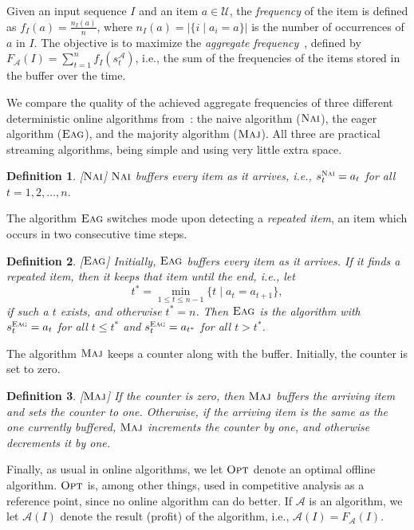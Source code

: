 \documentclass[11pt]{article}
\newtheorem{xdefinition}{Definition}
\newenvironment{definition}{\begin{xdefinition}\rm}{\hspace*{\fill}\raisebox{-1pt}{\boldmath$\Box$}\end{xdefinition}}
\newcommand{\opt}{{\ensuremath{\textsc{Opt}}}\xspace}
\newcommand{\maj}{{\ensuremath{\textsc{Maj}}}\xspace}
\newcommand{\nav}{{\ensuremath{\textsc{Nai}}}\xspace}
\newcommand{\eag}{{\ensuremath{\textsc{Eag}}}\xspace}
\newcommand{\majnospace}{{\ensuremath{\textsc{Maj}}}}
\newcommand{\navnospace}{{\ensuremath{\textsc{Nai}}}}
\newcommand{\eagnospace}{{\ensuremath{\textsc{Eag}}}}
\newcommand{\algA}{{\ensuremath{\mathcal{A}}}\xspace}
\begin{document}
Given an input sequence $I$ and an item $a\in \mathcal{U}$, the {\em frequency}
of the item is defined as $f_I(a) = \frac{n_I(a)}{n}$,
where $n_I(a) = | \{i\mid a_i=a\}|$ is the number of occurrences of $a$ in $I$.
The objective is to maximize the
\emph{aggregate frequency}~\cite{Giannakopoulos12}, defined by
$F_{\algA}(I)=\sum_{t=1}^n f_I(s^{\mathcal{A}}_t)$,
i.e., the sum of the frequencies of the items stored in the
buffer over the time.



We compare the quality of the achieved aggregate frequencies
of three different deterministic online algorithms
from~\cite{Giannakopoulos12}:
the naive algorithm (\nav), the eager algorithm (\eag),
and the majority algorithm (\maj).
All three are practical streaming 
algorithms, being simple and using very little extra space.

\begin{definition}\label{def:nav}
\mbox{\rm [\navnospace]} \nav buffers every item as it arrives,
i.e., $s^{\nav}_t = a_t$ for all $t=1,2,\ldots, n$.
\end{definition}

The algorithm \eag switches mode upon detecting a {\em repeated item}, an
item which occurs in two consecutive time steps.
\begin{definition}\label{def:eag}
\mbox{\rm [\eagnospace]} Initially, \eag buffers every item as it arrives.
If it finds a repeated item, then it keeps
that item until the end, i.e., let
$$t^* =\min_{1\leq t\leq n-1} \{t\mid a_t = a_{t+1}\},$$
if such a $t$ exists, and otherwise $t^* = n$.
Then \eag is the algorithm with $s^{\eag}_t = a_t$ for all $t\leq t^*$ and
$s^{\eag}_t = a_{t^*}$ for all $t>t^*$.
\end{definition}


The algorithm \maj keeps a counter along with the buffer.
Initially, the counter is set to zero.
\begin{definition}\label{def:maj}
\mbox{\rm [\majnospace]}
If the counter is zero, then \maj buffers the arriving item and sets the counter to one.
Otherwise, if the arriving item is the same as the one currently buffered,
\maj increments the counter by one, and otherwise decrements it by one.
\end{definition}

Finally, as usual in online algorithms, we let \opt denote an optimal
offline algorithm. \opt is, among other things, used in competitive
analysis as a reference point, since no online algorithm can do better.
If $\algA$ is an algorithm, we let $\algA(I)$ denote the result (profit)
of the algorithm, i.e., $\algA(I)=F_{\algA}(I)$.
\end{document}
